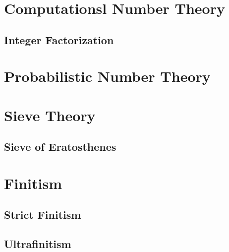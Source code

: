 \section{Computationsl Number Theory}\label{sec:computational_number_theory}

\subsection{Integer Factorization}\label{sec:integer_factorization}



\section{Probabilistic Number Theory}\label{sec:probabilistic_number_theory}

\section{Sieve Theory}\label{sec:sieve_theory}

\subsection{Sieve of Eratosthenes}\label{sec:sieve}



\section{Finitism}\label{sec:finitism}

\subsection{Strict Finitism}\label{sec:strict_finitism}

\subsection{Ultrafinitism}\label{sec:ultrafinitism}
